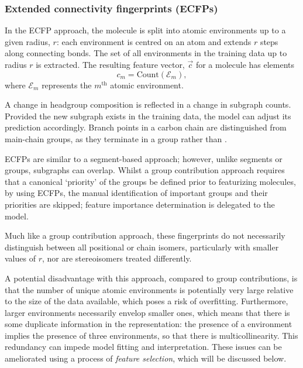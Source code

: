 \subsubsection{Extended connectivity fingerprints (ECFPs)}

In the ECFP approach, the molecule is split into atomic environments up to a
given radius, $r$: each environment is centred on an atom and extends $r$ steps
along connecting bonds. The set of all environments in the training data up to
radius $r$ is extracted. The resulting feature vector, $\vec{c}$ for a molecule
has elements
\begin{equation}
    \label{eq:ecfp}
    c_m = \text{Count}(\mathcal{E}_m),
\end{equation}
where $\mathcal{E}_m$ represents the $m^\text{th}$ atomic environment.

A change in headgroup composition is reflected in a change in subgraph counts.
Provided the new subgraph exists in the training data, the model can adjust its
prediction accordingly. Branch points in a carbon chain are distinguished from
main-chain groups, as they terminate in a  group rather than .

ECFPs are similar to a segment-based approach; however, unlike segments or
groups, subgraphs can overlap. Whilst a group contribution approach requires
that a canonical `priority' of the groups be defined prior to featurizing
molecules, by using ECFPs, the manual identification of important groups and
their priorities are skipped; feature importance determination is delegated to
the model.

Much like a group contribution approach, these fingerprints do not necessarily
distinguish between all positional or chain isomers, particularly with smaller
values of $r$, nor are stereoisomers treated differently.

A potential disadvantage with this approach, compared to group contributions, is
that the number of unique atomic environments is potentially very large relative
to the size of the data available, which poses a risk of overfitting.
Furthermore, larger environments necessarily envelop smaller ones, which means
that there is some duplicate information in the representation: the presence of
a  environment implies the presence of three  environments,
so that there is multicollinearity. This redundancy can impede model fitting and
interpretation. These issues can be ameliorated using a process of
\emph{feature selection}, which will be discussed below.

